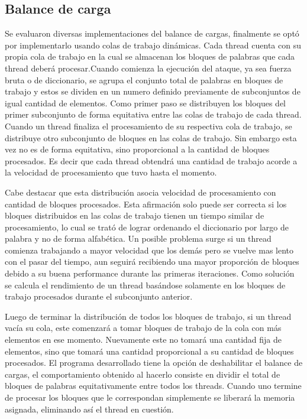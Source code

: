 \documentclass[conference]{IEEEtran}
\begin{document}
\subsection{Balance de carga}
Se evaluaron diversas implementaciones del balance de cargas, finalmente se optó por implementarlo usando colas de trabajo dinámicas. Cada thread cuenta con su propia cola de trabajo en la cual se almacenan los bloques de palabras que cada thread deberá procesar.\newline Cuando comienza la ejecución del ataque, ya sea fuerza bruta o de diccionario, se agrupa el conjunto total de palabras en bloques de trabajo y estos se dividen en un numero definido previamente de subconjuntos de igual cantidad de elementos. Como primer paso se distribuyen los bloques del primer subconjunto de forma equitativa entre las colas de trabajo de cada thread. Cuando un thread finaliza el procesamiento de su respectiva cola de trabajo, se distribuye otro subconjunto de bloques en las colas de trabajo. Sin embargo esta vez no es de forma equitativa, sino proporcional a la cantidad de bloques procesados. Es decir que cada thread obtendrá una cantidad de trabajo acorde a la velocidad de procesamiento que tuvo hasta el momento. \newline

Cabe destacar que esta distribución asocia velocidad de procesamiento con cantidad de bloques procesados. Esta afirmación solo puede ser correcta si los bloques distribuidos en las colas de trabajo tienen un tiempo similar de procesamiento, lo cual se trató de lograr ordenando el diccionario por largo de palabra y no de forma alfabética. Un posible problema surge si un thread comienza trabajando a mayor velocidad que los demás pero se  vuelve mas lento con el pasar del tiempo, aun seguirá recibiendo una mayor proporción de bloques debido a su buena performance durante las primeras iteraciones. Como solución se calcula el rendimiento de un thread basándose solamente en los bloques de trabajo procesados durante el subconjunto anterior. \newline

Luego de terminar la distribución de todos los bloques de trabajo, si un thread vacía su cola, este comenzará a tomar bloques de trabajo de la cola con más elementos en ese momento. Nuevamente este no tomará una cantidad fija de elementos, sino que tomará una cantidad proporcional a su cantidad de bloques procesados. \newline
El programa desarrollado tiene la opción de deshabilitar el balance de cargas, el comportamiento obtenido al hacerlo consiste en dividir el total de bloques de palabras equitativamente entre todos los threads. Cuando uno termine de procesar los bloques que le correspondan simplemente se liberará la memoria asignada, eliminando así el thread en cuestión.
\end{document}
